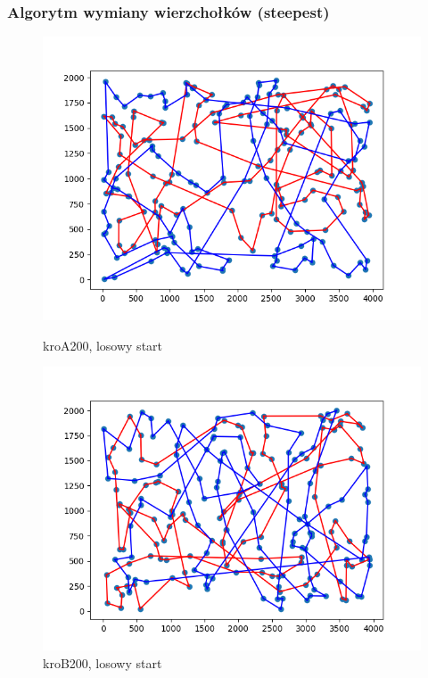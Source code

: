 \documentclass[11pt]{article}
\begin{document}
\subsubsection{Algorytm wymiany wierzchołków (steepest)}
\begin{figure}[H]
    \centering
    \begin{minipage}[t]{0.45\textwidth}
        \centering
        \includegraphics[width=\linewidth]{best_paths/kroA200/traverse_steepest_vertex/randomstart}
        \caption{kroA200, losowy start}
    \end{minipage}
    \hfill
    \begin{minipage}[t]{0.45\textwidth}
        \centering
        \includegraphics[width=\linewidth]{best_paths/kroB200/traverse_steepest_vertex/randomstart}
        \caption{kroB200, losowy start}
    \end{minipage}


\end{figure}
\end{document}
